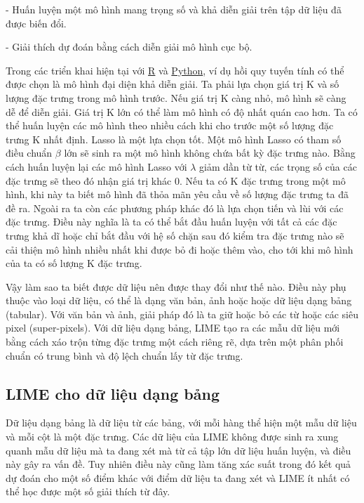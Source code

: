 - Huấn luyện một mô hình mang trọng số và khả diễn giải trên tập dữ liệu đã được biến đổi.

- Giải thích dự đoán bằng cách diễn giải mô hình cục bộ.

Trong các triển khai hiện tại với \href{https://github.com/thomasp85/lime}{R} và \href{https://github.com/marcotcr/lime}{Python}, ví dụ hồi quy tuyến tính có thể được chọn là mô hình đại diện khả diễn giải. Ta phải lựa chọn giá trị K và số lượng đặc trưng trong mô hình trước. Nếu giá trị K càng nhỏ, mô hình sẽ càng dễ để diễn giải. Giá trị K lớn có thể làm mô hình có độ nhất quán cao hơn. Ta có thể huấn luyện các mô hình theo nhiều cách khi cho trước một số lượng đặc trưng K nhất định. Lasso là một lựa chọn tốt. Một mô hình Lasso có tham số điều chuẩn $\beta$ lớn sẽ sinh ra một mô hình không chứa bất kỳ đặc trưng nào. Bằng cách huấn luyện lại các mô hình Lasso với $\lambda$ giảm dần từ từ, các trọng số của các đặc trưng sẽ theo đó nhận giá trị khác 0. Nếu ta có K đặc trưng trong một mô hình, khi này ta biết mô hình đã thỏa mãn yêu cầu về số lượng đặc trưng ta đã đề ra. Ngoài ra ta còn các phương pháp khác đó là lựa chọn tiến và lùi với các đặc trưng. Điều này nghĩa là ta có thể bắt đầu huấn luyện với tất cả các đặc trưng khả dĩ hoặc chỉ bắt đầu với hệ số chặn sau đó kiểm tra đặc trưng nào sẽ cải thiện mô hình nhiều nhất khi được bỏ đi hoặc thêm vào, cho tới khi mô hình của ta có số lượng K đặc trưng.

Vậy làm sao ta biết được dữ liệu nên được thay đổi như thế nào. Điều này phụ thuộc vào loại dữ liệu, có thể là dạng văn bản, ảnh hoặc hoặc dữ liệu dạng bảng (tabular). Với văn bản và ảnh, giải pháp đó là ta giữ hoặc bỏ các từ hoặc các siêu pixel (super-pixels). Với dữ liệu dạng bảng, LIME tạo ra các mẫu dữ liệu mới bằng cách xáo trộn từng đặc trưng một cách riêng rẽ, dựa trên một phân phối chuẩn có trung bình và độ lệch chuẩn lấy từ đặc trưng.

\subsection{LIME cho dữ liệu dạng bảng}
Dữ liệu dạng bảng là dữ liệu từ các bảng, với mỗi hàng thể hiện một mẫu dữ liệu và mỗi cột là một đặc trưng. Các dữ liệu của LIME không được sinh ra xung quanh mẫu dữ liệu mà ta đang xét mà từ cả tập lớn dữ liệu huấn luyện, và điều này gây ra vấn đề. Tuy nhiên điều này cũng làm tăng xác suất trong đó kết quả dự đoán cho một số điểm khác với điểm dữ liệu ta đang xét và LIME ít nhất có thể học được một số giải thích từ đây.

